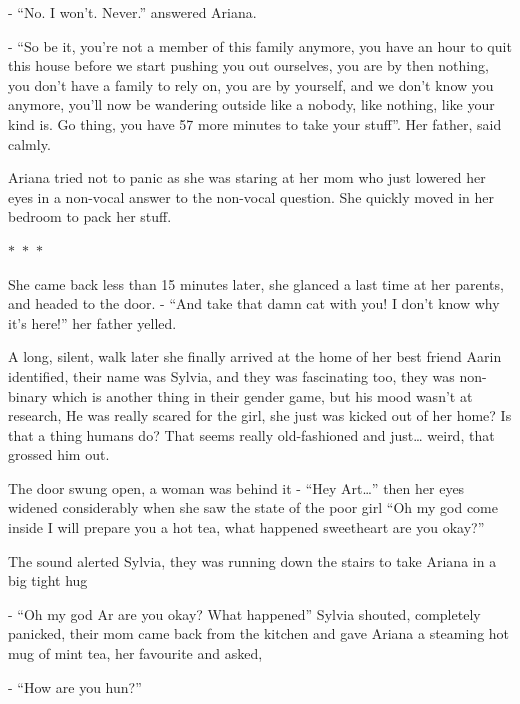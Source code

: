 \documentclass[hidelinks,12pt,a4paper]{book}
\newcommand\sep{\begin{center}
  \boldmath $\ast$~$\ast$~$\ast$
\end{center}}
\begin{document}
- “No. I won't. Never.” answered Ariana.\newline

- “So be it, you're not a member of this family anymore, you have an hour 
to quit this house before we start pushing you out ourselves, you are by then nothing, 
you don't have a family to rely on, you are by yourself, and we don't know you anymore, 
you'll now be wandering outside like a nobody, like nothing, like your kind is. Go thing, 
you have 57 more minutes to take your stuff”. Her father, said calmly.\par
\bigskip

Ariana tried not to panic as she was staring at her mom who just lowered her eyes in a 
non-vocal answer to the non-vocal question. She quickly moved in her bedroom to pack her stuff.

\sep 

She came back less than 15 minutes later, she glanced a last time at her parents, and headed to the door.\newline
- “And take that damn cat with you! I don't know why it's here!” her father yelled.\par
\bigskip

A long, silent, walk later she finally arrived at the home of her best friend Aarin identified, 
their name was Sylvia, and they was fascinating too, they was non-binary which is another thing in their 
gender game, but his mood wasn't at research, He was really scared for the girl, she just was kicked out of
 her home? Is that a thing humans do? That seems really old-fashioned and just… weird, that grossed him out.\par
 \bigskip

The door swung open, a woman was behind it\newline
- “Hey Art…” then her eyes widened considerably when she saw the state of the poor girl 
“Oh my god come inside I will prepare you a hot tea, what happened sweetheart are you okay?”\par
\bigskip

The sound alerted Sylvia, they was running down the stairs to take Ariana in a big tight hug\newline

- “Oh my god Ar are you okay? What happened” Sylvia shouted, completely panicked, 
their mom came back from the kitchen and gave Ariana a steaming hot mug of mint tea, her favourite and asked,\newline

- “How are you hun?”\par
\bigskip
\end{document}
